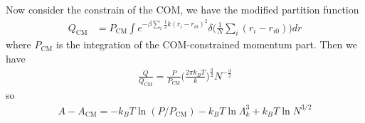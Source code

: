 \documentclass[aps,pre,a4paper,showkeys,fleqn]{revtex4}
\newcommand{\com}[0]{{\textrm{CM}}}
\begin{document}
Now consider the constrain of the COM, we have the modified partition function
\begin{align*}
  Q_\com
  &= 
    {P_\com}
    \int e^{-\beta\sum_i \frac 12k(r_i - r_{i0})^2} \delta\big(\frac1N\sum_i (r_i -  r_{i0})\big) dr 
\end{align*}
where $P_\com$ is the integration of the COM-constrained momentum part.
Then we have
\begin{align}
  \frac{Q}{Q_\com} = \frac{P}{P_\com}\Big( \frac{2\pi k_BT}k  \Big)^{\frac32} N^{-\frac32}
\end{align}
so
\begin{align}
  A - A_\com = -k_BT \ln(P/P_\com) - k_BT \ln \Lambda_k^3 + k_BT \ln N^{3/2}
\end{align}
\end{document}
